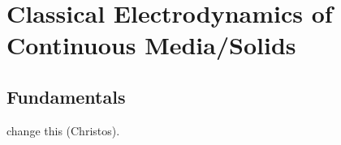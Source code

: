 
%

\chapter{Classical Electrodynamics of Continuous Media/Solids}
\label{ch:classical_electrodynamics}
\section{Fundamentals}
\label{sec:introduction}


change this (Christos).








